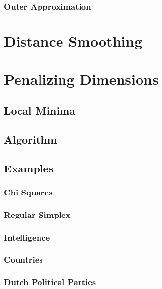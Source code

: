 \documentclass[
  12pt,
]{book}
\begin{document}
\subsubsection{Outer Approximation}\label{outer-approximation}

\section{Distance Smoothing}\label{distance-smoothing}

\section{Penalizing Dimensions}\label{penalizing-dimensions}

\subsection{Local Minima}\label{local-minima}

\subsection{Algorithm}\label{algorithm}

\subsection{Examples}\label{examples-4}

\subsubsection{Chi Squares}\label{chi-squares}

\subsubsection{Regular Simplex}\label{regular-simplex}

\subsubsection{Intelligence}\label{intelligence}

\subsubsection{Countries}\label{countries}

\subsubsection{Dutch Political Parties}\label{dutch-political-parties}
\end{document}
